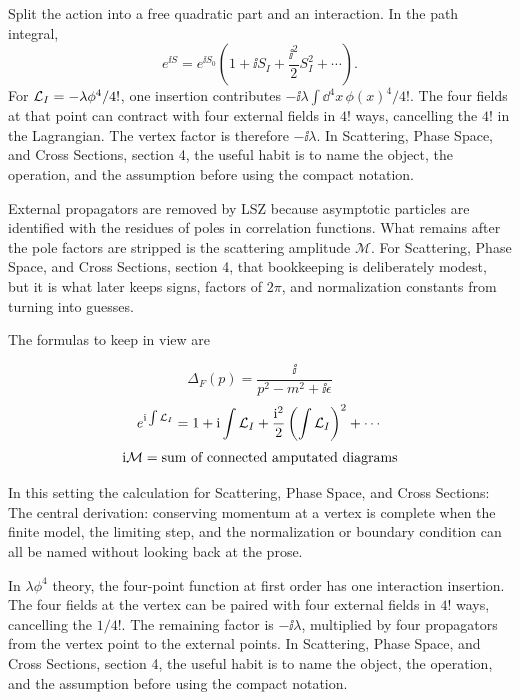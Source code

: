 Split the action into a free quadratic part and an interaction.  In the path integral,
\[
  e^{\ii S}=e^{\ii S_0}\left(1+\ii S_I+\frac{\ii^2}{2}S_I^2+\cdots\right).
\]
For \(\mathcal L_I=-\lambda\phi^4/4!\), one insertion contributes \(-\ii\lambda\int\dd^4x\,\phi(x)^4/4!\).  The four fields at that point can contract with four external fields in \(4!\) ways, cancelling the \(4!\) in the Lagrangian.  The vertex factor is therefore \(-\ii\lambda\).  In Scattering, Phase Space, and Cross Sections, section 4, the useful habit is to name the object, the operation, and the assumption before using the compact notation.

External propagators are removed by LSZ because asymptotic particles are identified with the residues of poles in correlation functions.  What remains after the pole factors are stripped is the scattering amplitude \(\mathcal M\).  For Scattering, Phase Space, and Cross Sections, section 4, that bookkeeping is deliberately modest, but it is what later keeps signs, factors of \(2\pi\), and normalization constants from turning into guesses.

The formulas to keep in view are

\[
  \Delta_F(p)=\frac{\ii}{p^2-m^2+\ii\epsilon}
\]
\[
  e^{\mathrm i\int\mathcal L_I}=1+\mathrm i\int\mathcal L_I+\frac{\mathrm i^2}{2}\left(\int\mathcal L_I\right)^2+\cdots
\]
\[
  \mathrm i\mathcal M=\hbox{sum of connected amputated diagrams}
\]

In this setting the calculation for Scattering, Phase Space, and Cross Sections: The central derivation: conserving momentum at a vertex is complete when the finite model, the limiting step, and the normalization or boundary condition can all be named without looking back at the prose.




\begin{example}
In \(\lambda\phi^4\) theory, the four-point function at first order has one interaction insertion.  The four fields at the vertex can be paired with four external fields in \(4!\) ways, cancelling the \(1/4!\).  The remaining factor is \(-\ii\lambda\), multiplied by four propagators from the vertex point to the external points.  In Scattering, Phase Space, and Cross Sections, section 4, the useful habit is to name the object, the operation, and the assumption before using the compact notation.
\end{example}



